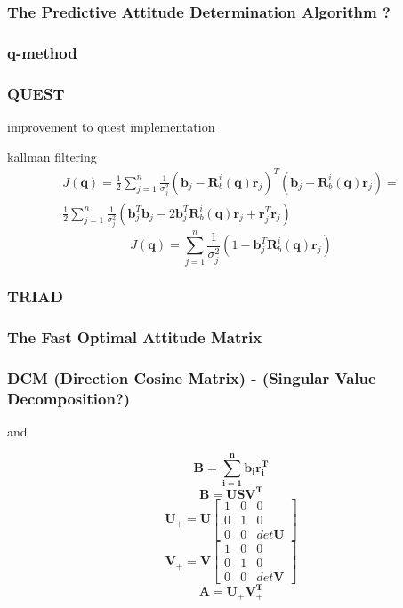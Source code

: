 \documentclass[12pt,a4paper,oneside]{article}
\begin{document}
\subsubsection{The Predictive Attitude Determination Algorithm ?}
\cite{park2006attitude}
\subsubsection{q-method}
\subsubsection{QUEST}
improvement to quest implementation \cite{RIS_1} \par
kallman filtering \cite{shuster1990kalman}
\begin{equation}
\begin{split}
J(\bm{q}) = \frac{1}{2}\sum_{j=1}^n\frac{1}{\sigma_j^2}(\bm{b}_j - \bm{R}_b^i(\bm{q})\bm{r}_j)^T(\bm{b}_j - \bm{R}_b^i(\bm{q})\bm{r}_j) = \\
\frac{1}{2}\sum_{j=1}^n\frac{1}{\sigma_j^2}(\bm{b}_j^T\bm{b}_j - 2\bm{b}_j^T\bm{R}_b^i(\bm{q})\bm{r}_j + \bm{r}_j^T\bm{r}_j)
\end{split}
\end{equation}
\begin{equation}
J(\bm{q}) = \sum_{j=1}^n\frac{1}{\sigma_j^2}(1 - \bm{b}_j^T\bm{R}_b^i(\bm{q})\bm{r}_j)
\end{equation}
\subsubsection{TRIAD}
\subsubsection{The Fast Optimal Attitude Matrix}
\subsubsection{DCM (Direction Cosine Matrix) - (Singular Value Decomposition?)}
\cite{juang2003efficient}
 and

\cite{6187242}
\begin{equation}
\bm{B = \sum_{i=1}^nb_ir_i^T}
\end{equation}
\begin{equation}
\bm{B = USV^T}
\end{equation}
\begin{equation}
\bm{U}_+ = \bm{U}\begin{bmatrix}
1 & 0 & 0 \\
0 & 1 & 0 \\
0 & 0 & det\bm{U}
\end{bmatrix}
\end{equation}
\begin{equation}
\bm{V}_+ = \bm{V}\begin{bmatrix}
1 & 0 & 0 \\
0 & 1 & 0 \\
0 & 0 & det\bm{V}
\end{bmatrix}
\end{equation}
\begin{equation}
\bm{A = U_+V_+^T}
\end{equation}
\newpage
\end{document}
